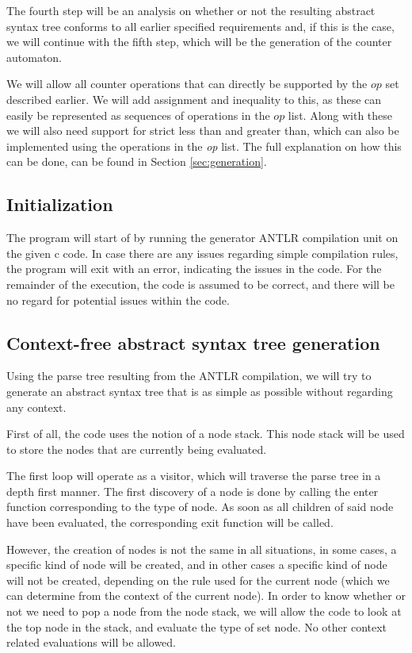 \documentclass[12pt]{article}
\begin{document}
The fourth step will be an analysis on whether or not the resulting abstract syntax tree conforms to all earlier specified requirements and, if this is the case, we will continue with the fifth step, which will be the generation of the counter automaton.

We will allow all counter operations that can directly be supported by the $op$ set described earlier. We will add assignment and inequality to this, as these can easily be represented as sequences of operations in the $op$ list. Along with these we will also need support for strict less than and greater than, which can also be implemented using the operations in the \textit{op} list. The full explanation on how this can be done, can be found in Section \ref{sec:generation}.

\subsection{Initialization}
The program will start of by running the generator ANTLR compilation unit on the given c code. In case there are any issues regarding simple compilation rules, the program will exit with an error, indicating the issues in the code. For the remainder of the execution, the code is assumed to be correct, and there will be no regard for potential issues within the code.

\subsection{Context-free abstract syntax tree generation}
Using the parse tree resulting from the ANTLR compilation, we will try to generate an abstract syntax tree that is as simple as possible without regarding any context. 

First of all, the code uses the notion of a node stack. This node stack will be used to store the nodes that are currently being evaluated.

The first loop will operate as a visitor, which will traverse the parse tree in a depth first manner. The first discovery of a node is done by calling the enter function corresponding to the type of node. As soon as all children of said node have been evaluated, the corresponding exit function will be called. 

However, the creation of nodes is not the same in all situations, in some cases, a specific kind of node will be created, and in other cases a specific kind of node will not be created, depending on the rule used for the current node (which we can determine from the context of the current node). In order to know whether or not we need to pop a node from the node stack, we will allow the code to look at the top node in the stack, and evaluate the type of set node. No other context related evaluations will be allowed.
\end{document}
